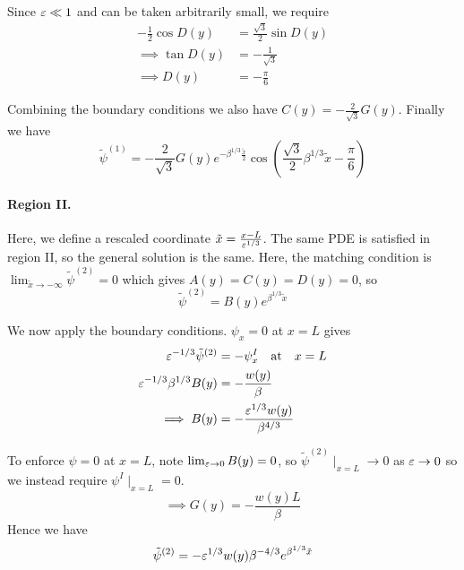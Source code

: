 \documentclass{jknotes}
\begin{document}
Since $\varepsilon \ll 1$ and can be taken arbitrarily small, we require
\begin{align}
	-\frac{1}{2}\cos D(y) &= \frac{\sqrt{3}}{2}\sin D(y) \\
	\implies \tan D(y) &= -\frac{1}{\sqrt{3}} \\
	\implies D(y) &= -\frac{\pi}{6}
\end{align}

Combining the boundary conditions we also have $C(y) =
-\frac{2}{\sqrt{3}}G(y)$. Finally we have
\begin{equation}
	\tilde{\psi}^{(1)} =-\frac{2}{\sqrt{3}} G(y)e^{-\beta^{1/3}\frac{\tilde{x}}{2}} \cos \left(
	\frac{\sqrt{3}}{2}\beta^{1/3}\tilde{x} -\frac{\pi}{6}\right)
\end{equation}

\paragraph{Region II.} Here, we define a rescaled coordinate $\tilde{x} =
\frac{x-L}{\varepsilon^{1/3}}$. The same PDE is satisfied in region II, so the
general solution is the same. Here, the matching condition is $\lim_{\tilde{x}
\to -\infty} \tilde{\psi}^{(2)} = 0$ which gives $A(y) = C(y) = D(y) = 0$, so
\begin{equation}
	\tilde{\psi}^{(2)} = B(y)e^{\beta^{1/3}\tilde{x}}
\end{equation}

We now apply the boundary conditions. $\psi_x = 0$ at $x = L$
gives
\begin{align}
	\varepsilon^{-1/3} \tilde{\psi}^{(2)} &= -\psi_x^I \hspace{1em} \text{at}
	\hspace{1em} x=L\\
	\varepsilon^{-1/3}\beta^{1/3}B(y) &= -\frac{w(y)}{\beta} \\
	\implies B(y) &= -\frac{\varepsilon^{1/3}w(y)}{\beta^{4/3}}
\end{align}

To enforce $\psi = 0$ at $x = L$, note $\lim_{\varepsilon \to 0} B(y) = 0$, so
$\tilde{\psi}^{(2)}\mid_{x=L} \to 0$ as $\varepsilon \to 0$ so we instead require
$\psi^I\mid_{x=L} = 0$.
\begin{equation}
	\implies G(y) = -\frac{w(y) L}{\beta}
\end{equation}
Hence we have
\begin{equation}
	\tilde{\psi}^{(2)} = -\varepsilon^{1/3} w(y)\beta^{-4/3}
	e^{\beta^{1/3}\tilde{x}}
\end{equation}
\end{document}
